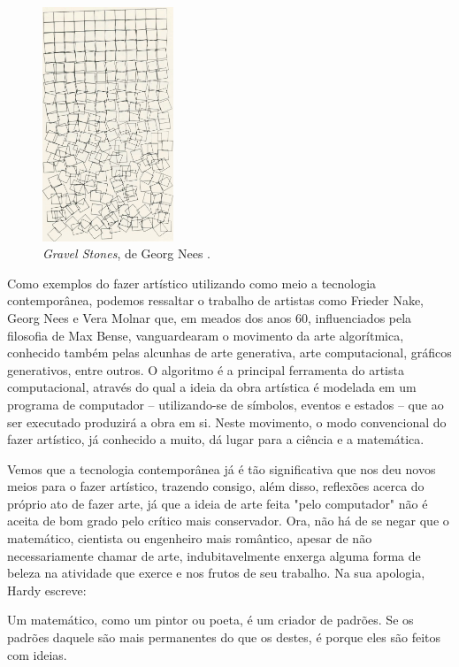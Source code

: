 \documentclass[12pt, a4paper]{article}
\begin{document}
\begin{figure}[ht!]
	\centering
	\includegraphics[width=\textwidth, height=7cm, keepaspectratio=true]{fig/gravel_stones}
	\caption{
		\emph{Gravel Stones}, de Georg Nees
		\cite{gravel_stones}.
	}
\end{figure}

Como exemplos do fazer artístico utilizando como meio a tecnologia contemporânea, podemos ressaltar o trabalho
de artistas como Frieder Nake, Georg Nees e Vera Molnar que, em meados dos anos 60, influenciados pela filosofia de Max Bense, vanguardearam 
o movimento da arte algorítmica, conhecido também pelas alcunhas de arte generativa, arte computacional, gráficos generativos, entre outros.
O algoritmo é a principal ferramenta do artista computacional, através do qual a ideia da obra artística é modelada em um programa de computador -- utilizando-se de símbolos, eventos e estados -- que ao ser executado produzirá a obra em si. Neste movimento, o modo convencional do fazer artístico, já conhecido a muito, dá lugar para a ciência e a matemática. 

Vemos que a tecnologia contemporânea já é tão significativa que nos deu novos meios para o fazer artístico, trazendo consigo, além disso, reflexões acerca do próprio ato de fazer arte, já que a ideia de arte feita "pelo computador" não é aceita de bom grado pelo crítico
mais conservador.
Ora, não há de se negar que o matemático, cientista ou engenheiro mais romântico, apesar de não necessariamente chamar de arte, indubitavelmente enxerga alguma forma de beleza na atividade que exerce e nos frutos de seu trabalho. 
Na sua apologia, Hardy \cite{hardy_apology} escreve:

\begin{displayquote}
Um matemático, como um pintor ou poeta, é um criador de padrões. Se os padrões daquele são mais permanentes do que os destes, é porque eles são feitos com ideias.
\end{displayquote}
\end{document}

